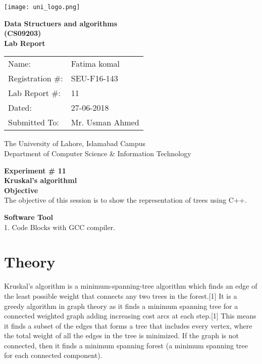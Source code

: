 \documentclass[11pt]{article}            %
\begin{document}
\begin{titlepage}
    \centering
  \vfill
    \texttt{[image: uni\_logo.png]} \\ 
	\vskip2cm
    {\bfseries\Large
	Data Structuers and algorithms \\ (CS09203)\\
	
	\vskip2cm
	Lab Report 
	 
	\vskip2cm
	}    

\begin{center}
\begin{tabular}{ l l  } 

Name: & Fatima komal \\ 
Registration \#: & SEU-F16-143 \\ 
Lab Report \#: & 11 \\ 
 Dated:& 27-06-2018\\ 
Submitted To:& Mr. Usman Ahmed\\ 

\end{tabular}
\end{center}
    \vfill
    The University of Lahore, Islamabad Campus\\
Department of Computer Science \& Information Technology
\end{titlepage}


    
    {\bfseries\Large
\centering
	Experiment \# 11 \\

Kruskal's algorithml \\
	
	}    
 \vskip1cm
 \textbf {Objective}\\ The objective of this session is to show the representation of trees using C++. 
 
 \textbf {Software Tool} \\
 1. Code Blocks with GCC compiler.

\section{Theory }              

Kruskal's algorithm is a minimum-spanning-tree algorithm which finds an edge of the least possible weight that connects any two trees in the forest.[1] It is a greedy algorithm in graph theory as it finds a minimum spanning tree for a connected weighted graph adding increasing cost arcs at each step.[1] This means it finds a subset of the edges that forms a tree that includes every vertex, where the total weight of all the edges in the tree is minimized. If the graph is not connected, then it finds a minimum spanning forest (a minimum spanning tree for each connected component).
\end{document}
